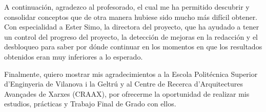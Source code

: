\documentclass[10pt,a4paper,twoside]{article}
\begin{document}
\begin{multicols*}{2}
    A continuación, agradezco al profesorado, el cual me ha permitido descubrir y consolidar conceptos que de otra manera hubiese sido mucho más difícil obtener. Con especialidad a Ester Simo, la directora del proyecto, que ha ayudado a tener un control del progreso del proyecto, la detección de mejoras en la redacción y el desbloqueo para saber por dónde continuar en los momentos en que los resultados obtenidos eran muy inferiores a lo esperado.

    Finalmente, quiero mostrar mis agradecimientos a la Escola Politécnica Superior d'Enginyeria de Vilanova i la Geltrú y al Centre de Recerca d'Arquitectures Avançades de Xarxes (CRAAX), por ofrecerme la oportunidad de realizar mis estudios, prácticas y Trabajo Final de Grado con ellos.

    

\end{multicols*}
\end{document}
